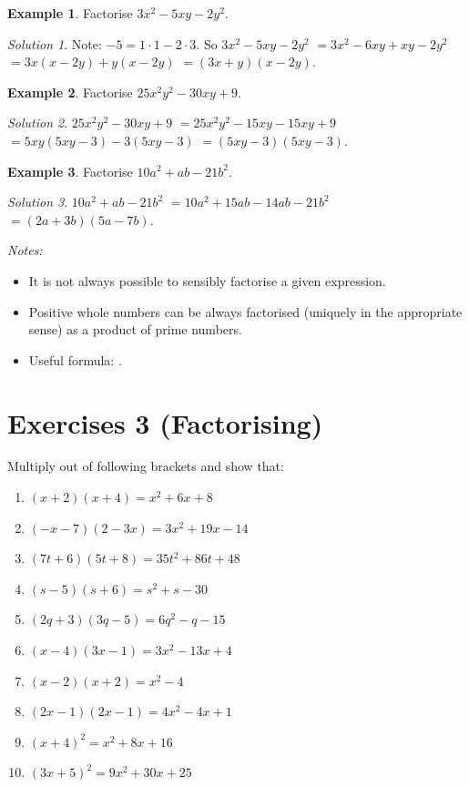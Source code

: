 \documentclass[
  12pt,
  oneside]{book}
\providecommand{\tightlist}{%
  \setlength{\itemsep}{0pt}\setlength{\parskip}{0pt}}
\theoremstyle{definition}
\theoremstyle{definition}
\newtheorem{example}{Example}[chapter]
\theoremstyle{definition}
\theoremstyle{definition}
\theoremstyle{remark}
\newtheorem*{solution}{Solution}
\begin{document}
\begin{example}
Factorise \(3x^2-5xy-2y^2\).
\end{example}

\begin{solution}
Note: \(-5=1\cdot 1-2\cdot 3\).
So \(3x^2-5xy-2y^2\) \(=3x^2- 6xy + xy-2y^2\) \(=3x(x-2y)+y(x-2y)\) \(=(3x+y)(x-2y)\).
\end{solution}

\begin{example}
Factorise \(25x^2y^2-30xy+9\).
\end{example}

\begin{solution}
\(25x^2y^2-30xy+9\) \(=25x^2y^2 -15xy -15xy +9\) \(=5xy(5xy-3)-3(5xy-3)\) \(=(5xy-3)(5xy-3)\).
\end{solution}

\begin{example}
Factorise \(10a^2+ab-21b^2\).
\end{example}

\begin{solution}
\(10a^2+ab-21b^2\) \(=10a^2 +15ab - 14ab -21b^2\) \(=(2a+3b)(5a-7b)\).
\end{solution}

\emph{Notes:}

\begin{itemize}
\tightlist
\item
  It is not always possible to sensibly factorise a given expression.
\item
  Positive whole numbers can be always factorised (uniquely in the appropriate sense) as a product of prime numbers.
\item
  Useful formula: .
\end{itemize}

\chapter*{Exercises 3 (Factorising)}\label{exercises-3-factorising}

Multiply out of following brackets and show that:

\begin{enumerate}
\def\labelenumi{\arabic{enumi}.}
\item
  \((x+2)(x+4) = x^2 + 6x + 8\)
\item
  \((-x-7)(2-3x)=3x^2+19x-14\)
\item
  \((7t+6)(5t+8)=35t^2+86t+48\)
\item
  \((s-5)(s+6) = s^2+s-30\)
\item
  \((2q+3)(3q-5)=6q^2-q-15\)
\item
  \((x-4)(3x-1) = 3x^2-13x +4\)
\item
  \((x-2)(x+2)=x^2-4\)
\item
  \((2x-1)(2x-1) = 4x^2-4x+1\)
\item
  \((x+4)^2 = x^2 + 8x + 16\)
\item
  \((3x+5)^2=9x^2+30x+25\)
\end{enumerate}
\end{document}
